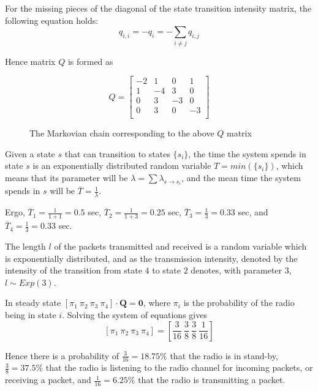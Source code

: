 For the missing pieces of the diagonal of the state transition intensity matrix,
the following equation holds:
$$q_{i,i} = -q_i = -\sum_{i \neq j} q_{i,j}$$

Hence matrix $Q$ is formed as

\begin{equation*}
  Q =
  \begin{bmatrix}
    -2  & 1   & 0   & 1   \\
    1   & -4  & 3   & 0   \\
    0   & 3   & -3  & 0   \\
    0   & 3   & 0   & -3  \\
  \end{bmatrix}
\end{equation*}

\begin{figure}[H]
	\centering
	\scalebox{1}{}
	\caption{The Markovian chain corresponding to the above $Q$ matrix}
\end{figure}

Given a state $s$ that can transition to states $\{s_i\}$, the time the
system spends in state $s$ is an exponentially distributed random variable
$T = min(\{s_i\})$, which means that its parameter will be
$\lambda = \sum \lambda_{s \rightarrow s_i}$, and the mean time the system
spends in $s$ will be $\overline{T} = \frac{1}{\lambda}$.

Ergo, $\overline{T}_1 = \frac{1}{1+1} = 0.5$ sec,
$\overline{T}_2 = \frac{1}{1+3} = 0.25$ sec,
$\overline{T}_3 = \frac{1}{3} = 0.33$ sec, and
$\overline{T}_4 = \frac{1}{3} = 0.33$ sec.

The length $l$ of the packets transmitted and received is a random variable
which is exponentially distributed, and as the transmission intensity, denoted
by the intensity of the transition from state $4$ to state $2$ denotes, with
parameter $3$, $l \sim Exp(3)$.

In steady state $[\pi_1\ \pi_2\ \pi_3\ \pi_4] \cdot \mathbf{Q} = \mathbf{0}$,
where $\pi_i$ is the probability of the radio being in state $i$. Solving the
system of equations gives
$$[\pi_1\ \pi_2\ \pi_3\ \pi_4] = [\frac{3}{16}\ \frac{3}{8}\ \frac{3}{8}\ \frac{1}{16}]$$

Hence there is a probability of $\frac{3}{16}=18.75\%$ that the radio is in
stand-by, $\frac{3}{8}=37.5\%$ that the radio is listening to the radio channel
for incoming packets, or receiving a packet, and $\frac{1}{16} = 6.25\%$ that
the radio is transmitting a packet.
